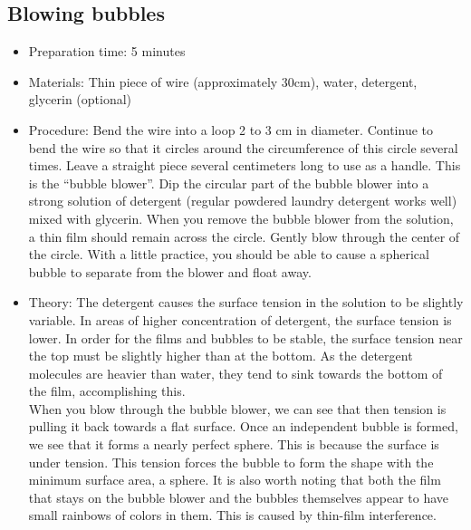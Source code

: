 \subsection{Blowing bubbles}
\begin{itemize}
\item{Preparation time: 5 minutes}
\item{Materials: Thin piece of wire (approximately 30cm), water, detergent, glycerin (optional)}
\item{Procedure: Bend the wire into a loop 2 to 3 cm in diameter. Continue to bend the wire so that it circles around the circumference of this circle several times. Leave a straight piece several centimeters long to use as a handle. This is the “bubble blower”. Dip the circular part of the bubble blower into a strong solution of detergent (regular powdered laundry detergent works well) mixed with glycerin. When you remove the bubble blower from the solution, a thin film should remain across the circle. Gently blow through the center of the circle. With a little practice, you should be able to cause a spherical bubble to separate from the blower and float away.}
\item{Theory: The detergent causes the surface tension in the solution to be slightly variable. In areas of higher concentration of detergent, the surface tension is lower. In order for the films and bubbles to be stable, the surface tension near the top must be slightly higher than at the bottom. As the detergent molecules are heavier than water, they tend to sink towards the bottom of the film, accomplishing this.\\
When you blow through the bubble blower, we can see that then tension is pulling it back towards a flat surface. Once an independent bubble is formed, we see that it forms a nearly perfect sphere. This is because the surface is under tension. This tension forces the bubble to form the shape with the minimum surface area, a sphere. It is also worth noting that both the film that stays on the bubble blower and the bubbles themselves appear to have small rainbows of colors in them. This is caused by thin-film interference.}
\end{itemize}

